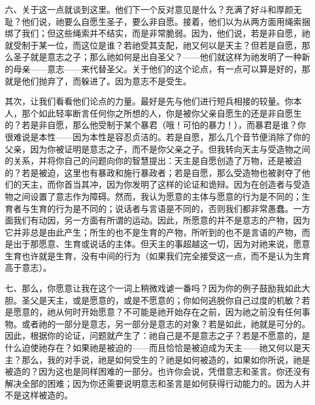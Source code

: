 六、关于这一点就谈到这里。他们下一个反对意见是什么？充满了好斗和厚颜无耻？他们说，祂要么自愿生圣子，要么非自愿。接着，他们以为从两方面用绳索捆绑了我们；但这些绳索并不结实，而是非常脆弱。因为，他们说，若是非自愿，祂就受制于某一位，而这位是谁？若祂受其支配，祂又何以是天主？但若是自愿，那么圣子就是意志之子；那么祂如何是出自圣父？——他们就这样为祂发明了一种新的母亲——意志——来代替圣父。关于他们的这个论点，有一点可以算是好的，那就是他们抛弃了，而躲进了。因为意志不是受生。\par

其次，让我们看看他们论点的力量。最好是先与他们进行短兵相接的较量。你本人，那个如此轻率断言任何你之所想的人，你是被你父亲自愿生的还是非自愿生的？若是非自愿，那么他受制于某个暴君（哦！可怕的暴力！），而暴君是谁？你很难说是本性——因为本性是容忍贞洁的。若是自愿，那么几个音节便消除了你的父亲，因为你被证明是意志之子，而不是你父亲之子。但我转向天主与受造物之间的关系，并将你自己的问题向你的智慧提出：天主是自愿创造了万物，还是被迫的？若是被迫，这里也有暴政和施行暴政者；若是自愿，那么受造物也被剥夺了他们的天主，而你首当其冲，因为你发明了这样的论证和诡辩。因为在创造者与受造物之间设置了意志作为障碍。然而，我认为愿意的主体与愿意的行为是不同的；生育者与生育的行为是不同的；说话者与言语是不同的，否则我们都非常愚蠢。一方面我们有动因，另一方面有所谓的运动。因此，所愿意的并不是意志的产物，因为它并非总是由此产生；所生的也不是生育的产物，所听到的也不是言语的产物，而是出于那愿意、生育或说话的主体。但天主的事超越这一切，因为对祂来说，愿意生育也许就是生育，没有中间的行为（如果我们完全接受这一点，而不是认为生育高于意志）。\par

七、那么，你愿意让我在这个一词上稍微戏谑一番吗？因为你的例子鼓励我如此大胆。圣父是天主，或是愿意的，或是不愿意的；你如何逃脱你自己过度的机敏？若是愿意的，祂从何时开始愿意？不可能是祂开始存在之前，因为祂之前没有任何事物。或者祂的一部分是意志，另一部分是意志的对象？若是如此，祂就是可分的。因此，根据你的论证，问题就产生了：祂自己是不是意志之子？若是不愿意的，是什么迫使祂存在？如果祂是被迫的——而且恰恰是被迫成为天主——祂又何以是天主？那么，我的对手说，祂是如何受生的？祂是如何被造的，如果如你所说，祂是被造的？因为这也是同样困难的一部分。也许你会说，凭借意志和圣言。你还没有解决全部的困难；因为你还需要说明意志和圣言是如何获得行动能力的。因为人并不是这样被造的。\par

